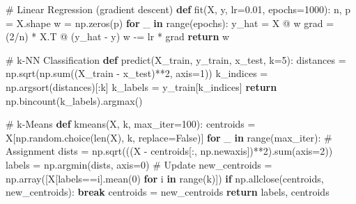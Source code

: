 \documentclass[11pt]{article}
\newenvironment{Shaded}{\begin{snugshade}}{\end{snugshade}}
\newcommand{\BuiltInTok}[1]{\textcolor[rgb]{0.50,0.55,0.55}{#1}}
\newcommand{\CommentTok}[1]{\textcolor[rgb]{0.48,0.49,0.49}{#1}}
\newcommand{\ControlFlowTok}[1]{\textcolor[rgb]{0.99,0.74,0.29}{\textbf{#1}}}
\newcommand{\DecValTok}[1]{\textcolor[rgb]{0.96,0.45,0.00}{#1}}
\newcommand{\FloatTok}[1]{\textcolor[rgb]{0.96,0.45,0.00}{#1}}
\newcommand{\KeywordTok}[1]{\textcolor[rgb]{0.81,0.81,0.76}{\textbf{#1}}}
\newcommand{\NormalTok}[1]{\textcolor[rgb]{0.81,0.81,0.76}{#1}}
\newcommand{\OperatorTok}[1]{\textcolor[rgb]{0.81,0.81,0.76}{#1}}
\newcommand{\VariableTok}[1]{\textcolor[rgb]{0.15,0.68,0.68}{#1}}
\begin{document}
\begin{Shaded}
\begin{Highlighting}[]
\CommentTok{\# Linear Regression (gradient descent)}
\KeywordTok{def}\NormalTok{ fit(X, y, lr}\OperatorTok{=}\FloatTok{0.01}\NormalTok{, epochs}\OperatorTok{=}\DecValTok{1000}\NormalTok{):}
\NormalTok{    n, p }\OperatorTok{=}\NormalTok{ X.shape}
\NormalTok{    w }\OperatorTok{=}\NormalTok{ np.zeros(p)}
    \ControlFlowTok{for}\NormalTok{ \_ }\KeywordTok{in} \BuiltInTok{range}\NormalTok{(epochs):}
\NormalTok{        y\_hat }\OperatorTok{=}\NormalTok{ X }\OperatorTok{@}\NormalTok{ w}
\NormalTok{        grad }\OperatorTok{=}\NormalTok{ (}\DecValTok{2}\OperatorTok{/}\NormalTok{n) }\OperatorTok{*}\NormalTok{ X.T }\OperatorTok{@}\NormalTok{ (y\_hat }\OperatorTok{{-}}\NormalTok{ y)}
\NormalTok{        w }\OperatorTok{{-}=}\NormalTok{ lr }\OperatorTok{*}\NormalTok{ grad}
    \ControlFlowTok{return}\NormalTok{ w}

\CommentTok{\# k{-}NN Classification}
\KeywordTok{def}\NormalTok{ predict(X\_train, y\_train, x\_test, k}\OperatorTok{=}\DecValTok{5}\NormalTok{):}
\NormalTok{    distances }\OperatorTok{=}\NormalTok{ np.sqrt(np.}\BuiltInTok{sum}\NormalTok{((X\_train }\OperatorTok{{-}}\NormalTok{ x\_test)}\OperatorTok{**}\DecValTok{2}\NormalTok{, axis}\OperatorTok{=}\DecValTok{1}\NormalTok{))}
\NormalTok{    k\_indices }\OperatorTok{=}\NormalTok{ np.argsort(distances)[:k]}
\NormalTok{    k\_labels }\OperatorTok{=}\NormalTok{ y\_train[k\_indices]}
    \ControlFlowTok{return}\NormalTok{ np.bincount(k\_labels).argmax()}

\CommentTok{\# k{-}Means}
\KeywordTok{def}\NormalTok{ kmeans(X, k, max\_iter}\OperatorTok{=}\DecValTok{100}\NormalTok{):}
\NormalTok{    centroids }\OperatorTok{=}\NormalTok{ X[np.random.choice(}\BuiltInTok{len}\NormalTok{(X), k, replace}\OperatorTok{=}\VariableTok{False}\NormalTok{)]}
    \ControlFlowTok{for}\NormalTok{ \_ }\KeywordTok{in} \BuiltInTok{range}\NormalTok{(max\_iter):}
        \CommentTok{\# Assignment}
\NormalTok{        dists }\OperatorTok{=}\NormalTok{ np.sqrt(((X }\OperatorTok{{-}}\NormalTok{ centroids[:, np.newaxis])}\OperatorTok{**}\DecValTok{2}\NormalTok{).}\BuiltInTok{sum}\NormalTok{(axis}\OperatorTok{=}\DecValTok{2}\NormalTok{))}
\NormalTok{        labels }\OperatorTok{=}\NormalTok{ np.argmin(dists, axis}\OperatorTok{=}\DecValTok{0}\NormalTok{)}
        \CommentTok{\# Update}
\NormalTok{        new\_centroids }\OperatorTok{=}\NormalTok{ np.array([X[labels}\OperatorTok{==}\NormalTok{i].mean(}\DecValTok{0}\NormalTok{) }\ControlFlowTok{for}\NormalTok{ i }\KeywordTok{in} \BuiltInTok{range}\NormalTok{(k)])}
        \ControlFlowTok{if}\NormalTok{ np.allclose(centroids, new\_centroids):}
            \ControlFlowTok{break}
\NormalTok{        centroids }\OperatorTok{=}\NormalTok{ new\_centroids}
    \ControlFlowTok{return}\NormalTok{ labels, centroids}


\end{Highlighting}
\end{Shaded}
\end{document}
